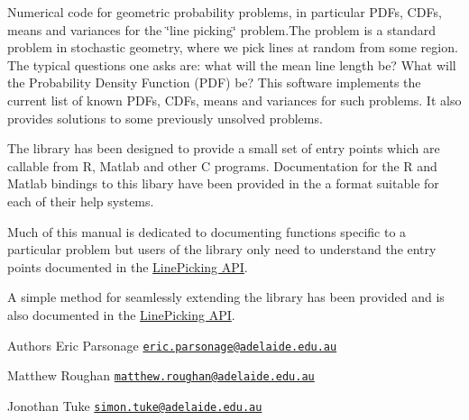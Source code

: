Numerical code for geometric probability problems, in particular P\-D\-Fs, C\-D\-Fs, means and variances for the \char`\"{}line picking\char`\"{} problem.\-The problem is a standard problem in stochastic geometry, where we pick lines at random from some region. The typical questions one asks are\-: what will the mean line length be? What will the Probability Density Function (P\-D\-F) be? This software implements the current list of known P\-D\-Fs, C\-D\-Fs, means and variances for such problems. It also provides solutions to some previously unsolved problems.

The library has been designed to provide a small set of entry points which are callable from R, Matlab and other C programs. Documentation for the R and Matlab bindings to this libary have been provided in the a format suitable for each of their help systems.

Much of this manual is dedicated to documenting functions specific to a particular problem but users of the library only need to understand the entry points documented in the \hyperlink{group__api}{Line\-Picking A\-P\-I}.

A simple method for seamlessly extending the library has been provided and is also documented in the \hyperlink{group__api}{Line\-Picking A\-P\-I}.

\begin{DoxyAuthor}{Authors}
Eric Parsonage \href{mailto:eric.parsonage@adelaide.edu.au}{\tt eric.\-parsonage@adelaide.\-edu.\-au} 

Matthew Roughan \href{mailto:matthew.roughan@adelaide.edu.au}{\tt matthew.\-roughan@adelaide.\-edu.\-au} 

Jonothan Tuke \href{mailto:simon.tuke@adelaide.edu.au}{\tt simon.\-tuke@adelaide.\-edu.\-au} 
\end{DoxyAuthor}
